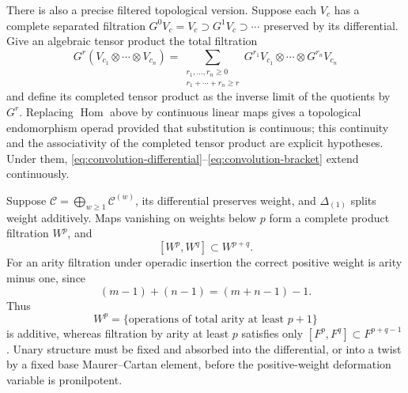 \documentclass[11pt]{article}
\theoremstyle{definition}
\theoremstyle{remark}
\begin{document}
There is also a precise filtered topological version.  Suppose each $V_c$ has
a complete separated filtration $G^0V_c=V_c\supset G^1V_c\supset\cdots$
preserved by its differential.  Give an algebraic tensor product the total
filtration
\[
 G^r(V_{c_1}\otimes\cdots\otimes V_{c_n})
 =\sum_{\substack{r_1,\ldots,r_n\geq0\\r_1+\cdots+r_n\geq r}}
 G^{r_1}V_{c_1}\otimes\cdots\otimes G^{r_n}V_{c_n}
\]
and define its completed tensor product as the inverse limit of the
quotients by $G^r$.  Replacing $\operatorname{Hom}$ above by continuous
linear maps gives a topological endomorphism operad provided that
substitution is continuous; this continuity and the associativity of the
completed tensor product are explicit hypotheses.  Under them,
\eqref{eq:convolution-differential}--\eqref{eq:convolution-bracket} extend
continuously.

Suppose $\mathcal C=\bigoplus_{w\geq1}\mathcal C^{(w)}$, its differential
preserves weight, and $\Delta_{(1)}$ splits weight additively.  Maps vanishing
on weights below $p$ form a complete product filtration $W^p$, and
\[
 [W^p,W^q]\subset W^{p+q}.
 \tag{5.9}\label{eq:weight-additivity}
\]
For an arity filtration under operadic insertion the correct positive weight
is arity minus one, since
\[
 (m-1)+(n-1)=(m+n-1)-1.
\]
Thus
\[
 W^p=\{\text{operations of total arity at least }p+1\}
 \tag{5.10}\label{eq:arity-weight}
\]
is additive, whereas filtration by arity at least $p$ satisfies only
$[F^p,F^q]\subset F^{p+q-1}$.  Unary structure must be fixed and absorbed
into the differential, or into a twist by a fixed base Maurer--Cartan
element, before the positive-weight deformation variable is pronilpotent.
\end{document}
